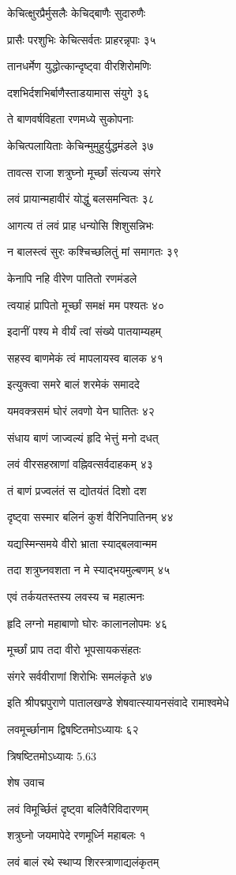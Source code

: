 केचित्क्षुरप्रैर्मुसलैः केचिद्बाणैः सुदारुणैः

प्रासैः परशुभिः केचित्सर्वतः प्राहरन्नृपाः ३५

तानधर्मेण युद्धोत्कान्दृष्ट्वा वीरशिरोमणिः

दशभिर्दशभिर्बाणैस्ताडयामास संयुगे ३६

ते बाणवर्षविहता रणमध्ये सुकोपनाः

केचित्पलायिताः केचिन्मुमुहुर्युद्धमंडले ३७

तावत्स राजा शत्रुघ्नो मूर्च्छां संत्यज्य संगरे

लवं प्रायान्महावीरं योद्धुं बलसमन्वितः ३८

आगत्य तं लवं प्राह धन्योसि शिशुसन्निभः

न बालस्त्वं सुरः कश्चिच्छलितुं मां समागतः ३९

केनापि नहि वीरेण पातितो रणमंडले

त्वयाहं प्रापितो मूर्च्छां समक्षं मम पश्यतः ४०

इदानीं पश्य मे वीर्यं त्वां संख्ये पातयाम्यहम्

सहस्व बाणमेकं त्वं मापलायस्व बालक ४१

इत्युक्त्वा समरे बालं शरमेकं समाददे

यमवक्त्रसमं घोरं लवणो येन घातितः ४२

संधाय बाणं जाज्वल्यं हृदि भेत्तुं मनो दधत्

लवं वीरसहस्राणां वह्निवत्सर्वदाहकम् ४३

तं बाणं प्रज्वलंतं स द्योतयंतं दिशो दश

दृष्ट्वा सस्मार बलिनं कुशं वैरिनिपातिनम् ४४

यद्यस्मिन्समये वीरो भ्राता स्याद्बलवान्मम

तदा शत्रुघ्नवशता न मे स्याद्भयमुल्बणम् ४५

एवं तर्कयतस्तस्य लवस्य च महात्मनः

हृदि लग्नो महाबाणो घोरः कालानलोपमः ४६

मूर्च्छां प्राप तदा वीरो भूपसायकसंहतः

संगरे सर्ववीराणां शिरोभिः समलंकृते ४७

इति श्रीपद्मपुराणे पातालखण्डे शेषवात्स्यायनसंवादे रामाश्वमेधे

लवमूर्च्छानाम द्विषष्टितमोऽध्यायः ६२

त्रिषष्टितमोऽध्यायः 5.63

शेष उवाच

लवं विमूर्च्छितं दृष्ट्वा बलिवैरिविदारणम्

शत्रुघ्नो जयमापेदे रणमूर्ध्नि महाबलः १

लवं बालं रथे स्थाप्य शिरस्त्राणाद्यलंकृतम्

